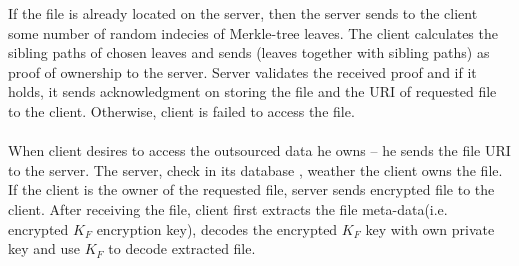 \documentclass[12pt]{article}
\begin{document}
If the file is already located on the server, then the server sends to the client some number of random indecies of Merkle-tree leaves. The client calculates the sibling paths of chosen leaves  and sends (leaves together with sibling paths) as proof of ownership to the server. Server validates the received proof and if it holds, it sends acknowledgment on storing the file and the URI of requested file to the client. Otherwise, client is failed to access the file.\\\\
When client desires to access the outsourced data he owns -- he sends the file URI to the server. The server, check in its database , weather the client owns the file. If the client is the owner of the requested file, server sends encrypted file to the client. After receiving the file, client first extracts the file meta-data(i.e. encrypted $K_F$ encryption key), decodes the encrypted $K_F$ key with own private key and use $K_F$ to decode extracted file.\\\\
\end{document}

